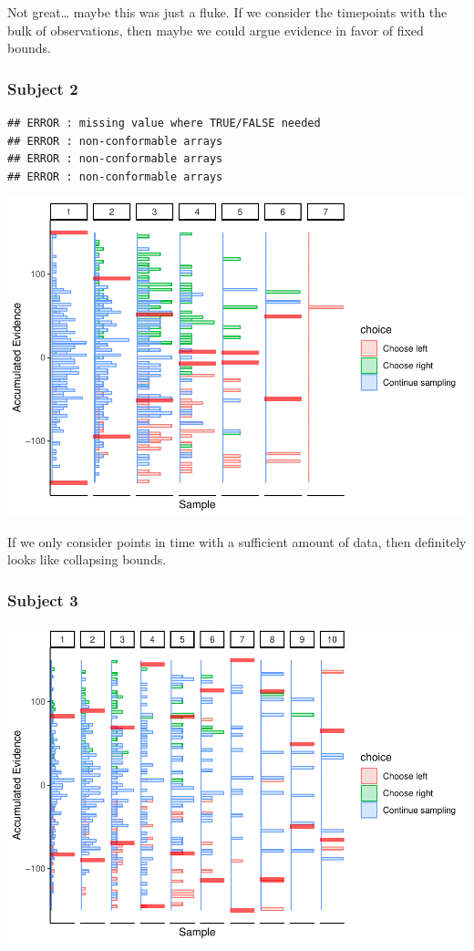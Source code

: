 \documentclass[
]{book}
\begin{document}
Not great\ldots{} maybe this was just a fluke. If we consider the timepoints with the bulk of observations, then maybe we could argue evidence in favor of fixed bounds.

\hypertarget{subject-2}{%
\subsubsection*{Subject 2}\label{subject-2}}

\begin{verbatim}
## ERROR : missing value where TRUE/FALSE needed 
## ERROR : non-conformable arrays 
## ERROR : non-conformable arrays 
## ERROR : non-conformable arrays
\end{verbatim}

\includegraphics{LateNightBayes_files/figure-latex/unnamed-chunk-19-1.pdf}

If we only consider points in time with a sufficient amount of data, then definitely looks like collapsing bounds.

\hypertarget{subject-3}{%
\subsubsection*{Subject 3}\label{subject-3}}

\includegraphics{LateNightBayes_files/figure-latex/unnamed-chunk-20-1.pdf}
\end{document}
